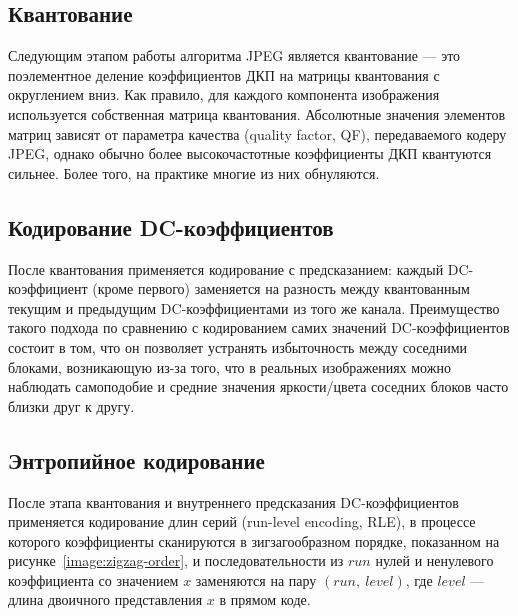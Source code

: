 \documentclass[times,specification,annotation]{itmo-student-thesis}
\begin{document}
\subsection{Квантование}\label{subsec:quantization}

Следующим этапом работы алгоритма JPEG является квантование --- это поэлементное деление коэффициентов ДКП на матрицы квантования с округлением вниз. Как правило, для каждого компонента изображения используется собственная матрица квантования. Абсолютные значения элементов матриц зависят от параметра качества (quality factor, QF), передаваемого кодеру JPEG, однако обычно более высокочастотные коэффициенты ДКП квантуются сильнее. Более того, на практике многие из них обнуляются.\par

\subsection{Кодирование DC-коэффициентов}\label{subsec:dc-coding}

После квантования применяется кодирование с предсказанием: каждый DC-коэффициент (кроме первого) заменяется на разность между квантованным текущим и предыдущим DC-коэффициентами из того же канала. Преимущество такого подхода по сравнению с кодированием самих значений DC-коэффициентов состоит в том, что он позволяет устранять избыточность между соседними блоками, возникающую из-за того, что в реальных изображениях можно наблюдать самоподобие и средние значения яркости/цвета соседних блоков часто близки друг к другу.\par

\subsection{Энтропийное кодирование}\label{subsec:entropy-coding}

После этапа квантования и внутреннего предсказания DC-коэффициентов применяется кодирование длин серий (run-level encoding, RLE), в процессе которого коэффициенты сканируются в зигзагообразном порядке, показанном на рисунке~\ref{image:zigzag-order}, и последовательности из $run$ нулей и ненулевого коэффициента со значением $x$ заменяются на пару $(run,\ level)$, где $level$ --- длина двоичного представления $x$ в прямом коде.\par
\end{document}
